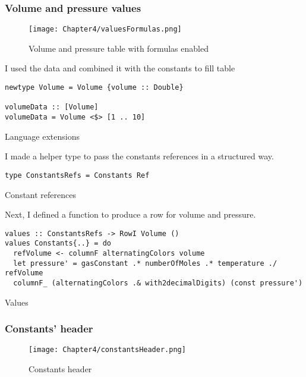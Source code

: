 \subsubsection{Volume and pressure values}

\begin{figure}[h]
  \centering
  \texttt{[image: Chapter4/valuesFormulas.png]}
  \caption{Volume and pressure table with formulas enabled}
  \label{fig:valuesFormulas}
\end{figure}

I used the data and combined it with the constants to fill table 

\begin{listing}[!h]
  \begin{verbatim}
newtype Volume = Volume {volume :: Double}

volumeData :: [Volume]
volumeData = Volume <$> [1 .. 10]
\end{verbatim}
\caption{Language extensions}
\label{example3:volumeData}
\end{listing}

I made a helper type to pass the constants references in a structured way.

\begin{listing}[!h]
  \begin{verbatim}
type ConstantsRefs = Constants Ref
\end{verbatim}
\caption{Constant references}
\label{example3:constantRefs}
\end{listing}

Next, I defined a function to produce a row for volume and pressure.

\begin{listing}[!h]
  \begin{verbatim}
values :: ConstantsRefs -> RowI Volume ()
values Constants{..} = do
  refVolume <- columnF alternatingColors volume
  let pressure' = gasConstant .* numberOfMoles .* temperature ./ refVolume
  columnF_ (alternatingColors .& with2decimalDigits) (const pressure')
\end{verbatim}
\caption{Values}
\label{example3:valuesCode}
\end{listing}

\subsubsection{Constants' header}

\begin{figure}[h]
  \centering
  \texttt{[image: Chapter4/constantsHeader.png]}
  \caption{Constants header}
  \label{fig:constantsHeader}
\end{figure}

